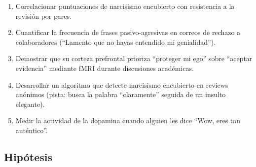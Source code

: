 \documentclass[
]{article}
\begin{document}
\begin{enumerate}
\def\labelenumi{\roman{enumi}.}
\item
  Correlacionar puntuaciones de narcisismo encubierto con resistencia a
  la revisión por pares.
\item
  Cuantificar la frecuencia de frases pasivo-agresivas en correos de
  rechazo a colaboradores (``Lamento que no hayas entendido mi
  genialidad'').
\item
  Demostrar que su corteza prefrontal prioriza ``proteger mi ego'' sobre
  ``aceptar evidencia'' mediante fMRI durante discusiones académicas.
\item
  Desarrollar un algoritmo que detecte narcisismo encubierto en reviews
  anónimos (pista: busca la palabra ``claramente'' seguida de un insulto
  elegante).
\item
  Medir la actividad de la dopamina cuando alguien les dice ``Wow, eres
  tan auténtico''.
\end{enumerate}

\subsection{Hipótesis}\label{hipuxf3tesis}
\end{document}
